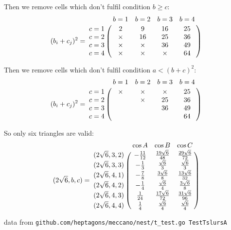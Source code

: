 \documentclass[11pt]{article}
\begin{document}
Then we remove cells which don't fulfil condition $b \ge c$:
\begin {equation}\label{E:2}
(b_i + c_j)^2 =\bordermatrix{~ & b=1 & b=2 & b=3 & b=4 \cr
c=1 &  2 &  9 & 16 & 25 \cr    
c=2 & \times & 16 & 25 & 36 \cr    
c=3 & \times & \times & 36 & 49 \cr    
c=4 & \times & \times & \times & 64 \cr}
\end {equation}

Then we remove cells which don't fulfil condition $a < (b+c)^2$:
\begin {equation}\label{E:3}
(b_i + c_j)^2 =\bordermatrix{~ & b=1 & b=2 & b=3 & b=4 \cr
c=1 & \times & \times & \times & 25 \cr    
c=2 & & \times & 25 & 36 \cr    
c=3 & & & 36 & 49 \cr    
c=4 & & & & 64 \cr}
\end {equation}
    
So only six triangles are valid:
\begin {equation}\label{E:4}
(2\sqrt{6},b,c) =\bordermatrix{~ & \cos{A} & \cos{B} & \cos{C} \cr
(2\sqrt{6},3,2) & -\frac{11}{12} & \frac{19\sqrt{6}}{48} & \frac{29\sqrt{6}}{72} \cr
(2\sqrt{6},3,3) & -\frac{1}{3}   & \frac{\sqrt{6}}{3}    & \frac{\sqrt{6}}{3}    \cr
(2\sqrt{6},4,1) & -\frac{7}{8}   & \frac{3\sqrt{6}}{8}   & \frac{13\sqrt{6}}{32} \cr
(2\sqrt{6},4,2) & -\frac{1}{4}   & \frac{\sqrt{6}}{4}    & \frac{3\sqrt{6}}{8}   \cr
(2\sqrt{6},4,3) &  \frac{1}{24}  & \frac{17\sqrt{6}}{72} & \frac{31\sqrt{6}}{96} \cr
(2\sqrt{6},4,4) &  \frac{1}{4}   & \frac{\sqrt{6}}{4}    & \frac{\sqrt{6}}{4}    \cr}
\end{equation}

data from \texttt{github.com/heptagons/meccano/nest/t\_test.go TestTslursA}
\end{document}
